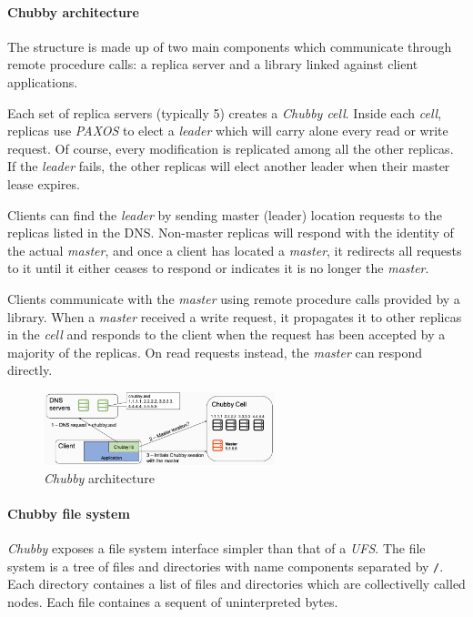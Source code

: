 \paragraph{Chubby architecture}
The structure is made up of two main components which communicate through remote
procedure calls: a replica server and a library linked against client applications.

Each set of replica servers (typically 5) creates a \emph{Chubby cell}. Inside
each \emph{cell}, replicas use \emph{PAXOS} to elect a \emph{leader} which will
carry alone every read or write request. Of course, every modification is
replicated among all the other replicas. If the \emph{leader} fails, the other
replicas will elect another leader when their master lease expires.

Clients can find the \emph{leader} by sending master (leader) location requests
to the replicas listed in the DNS. Non-master replicas will respond with the
identity of the actual \emph{master}, and once a client has located a
\emph{master}, it redirects all requests to it until it either ceases to respond
or indicates it is no longer the \emph{master}.

Clients communicate with the \emph{master} using remote procedure calls provided
by a library. When a \emph{master} received a write request, it propagates it
to other replicas in the \emph{cell} and responds to the client when the request
has been accepted by a majority of the replicas. On read requests instead, the
\emph{master} can respond directly.

\begin{figure}[ht!]
    \centering
    \includegraphics[width=0.6\textwidth]{images/chubby-design.png}
    \caption{\emph{Chubby} architecture}
\end{figure}

\paragraph{Chubby file system}
\emph{Chubby} exposes a file system interface simpler than that of a \emph{UFS}.
The file system is a tree of files and directories with name components separated
by \texttt{/}. Each directory containes a list of files and directories which
are collectivelly called nodes. Each file containes a sequent of uninterpreted
bytes.

